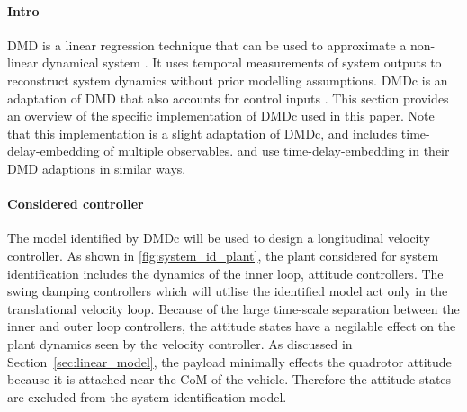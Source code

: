     
    \paragraph{Intro}        
    DMD is a linear regression technique that can be used to approximate a non-linear dynamical system \cite{Tu2014}.
    It uses temporal measurements of system outputs to reconstruct system dynamics without prior modelling assumptions.
    DMDc is an adaptation of DMD that also accounts for control inputs \cite{Proctor2016c}.
    This section provides an overview of the specific implementation of DMDc used in this paper.        
    Note that this implementation is a slight adaptation of DMDc, and includes time-delay-embedding of multiple observables. 
    \cite{Korda2018b} and \cite{Arbabi2018} use time-delay-embedding in their DMD adaptions in similar ways.

    \paragraph{Considered controller}
    The model identified by DMDc will be used to design a longitudinal velocity controller.
    As shown in \ref{fig:system_id_plant}, the plant considered for system identification includes the dynamics of the inner loop, attitude controllers.
    The swing damping controllers which will utilise the identified model act only in the translational velocity loop.
    Because of the large time-scale separation between the inner and outer loop controllers, 
    the attitude states have a negilable effect on the plant dynamics seen by the velocity controller.
    As discussed in Section~\ref{sec:linear_model}, the payload minimally effects the quadrotor attitude because it is attached near the CoM of the vehicle.
    Therefore the attitude states are excluded from the system identification model.

